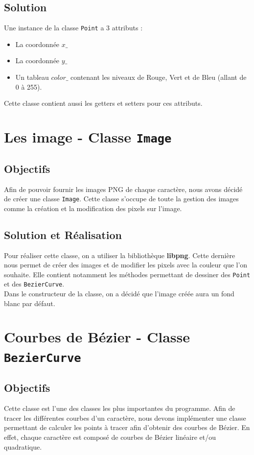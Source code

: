 \documentclass[a4paper, 12pt]{article}
\begin{document}
\subsection{Solution}
Une instance de la classe \texttt{Point} a 3 attributs : 
\begin{itemize}
\item La coordonnée $x\_$
\item La coordonnée $y\_$
\item Un tableau $color\_$ contenant les niveaux de Rouge, Vert et de Bleu (allant de 0 à 255). 
\end{itemize}
Cette classe contient aussi les getters et setters pour ces attributs.

\section{Les image - Classe \texttt{Image}}	
\subsection{Objectifs}
Afin de pouvoir fournir les images PNG de chaque caractère, nous avons décidé de créer une classe \texttt{Image}. Cette classe s'occupe de toute la gestion des images comme la création et la modification des pixels sur l'image.

\subsection{Solution et Réalisation}
Pour réaliser cette classe, on a utiliser la bibliothèque \textbf{libpng}. Cette dernière nous permet de créer des images et de modifier les pixels avec la couleur que l'on souhaite.
Elle contient notamment les méthodes permettant de dessiner des \texttt{Point} et des \texttt{BezierCurve}.\\

Dans le constructeur de la classe, on a décidé que l'image créée aura un fond blanc par défaut. 


\section{Courbes de Bézier - Classe \texttt{BezierCurve}}	
\subsection{Objectifs	}
Cette classe est l’une des classes les plus importantes du programme. Afin de tracer les différentes courbes d’un caractère, nous devons implémenter une classe permettant de calculer les points à tracer afin d'obtenir des courbes de Bézier. En effet, chaque caractère est composé de courbes de Bézier linéaire et/ou quadratique.
\end{document}
